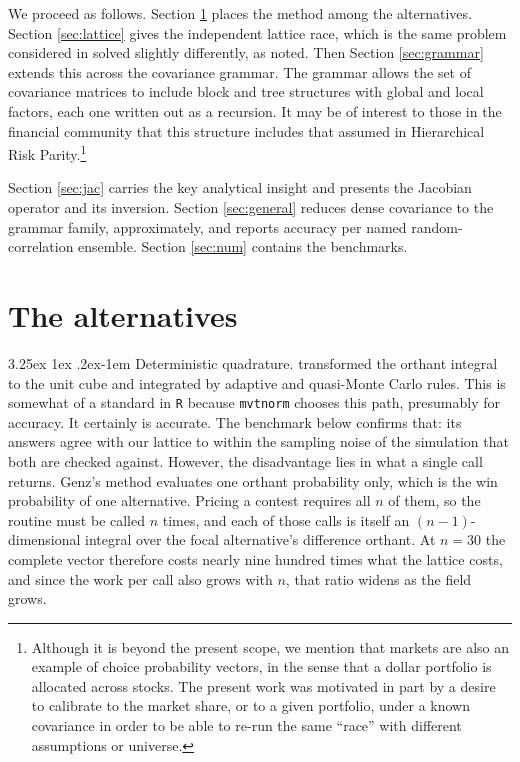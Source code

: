\documentclass[11pt]{article}
\makeatletter
\renewcommand\paragraph{\@startsection{paragraph}{4}{\z@}%
  {3.25ex \@plus1ex \@minus.2ex}{-1em}%
  {\normalfont\normalsize\itshape}}
\makeatother
\begin{document}
We proceed as follows. Section \ref{sec:alternatives} places the method among the alternatives.
Section \ref{sec:lattice} gives the independent lattice race, which is the same problem considered in \citet{cotton2021} solved slightly differently, as noted. Then Section
\ref{sec:grammar} extends this across the covariance grammar. The grammar allows the set of covariance matrices to include block and tree structures with global and local factors, each one written out as a recursion. It may be of interest to those in the financial community that this structure includes that assumed in Hierarchical Risk Parity.\footnote{Although it is beyond the present scope, we mention that markets are also an example of choice probability vectors, in the sense that a dollar portfolio is allocated across stocks. The present work was motivated in part by a desire to calibrate to the market share, or to a given portfolio, under a known covariance in order to be able to re-run the same ``race'' with different assumptions or universe.}

Section \ref{sec:jac} carries the key analytical insight and presents
the Jacobian operator and its inversion. Section \ref{sec:general} reduces
dense covariance to the grammar family, approximately, and reports accuracy
per named random-correlation ensemble. Section \ref{sec:num} contains the
benchmarks.

\section{The alternatives}\label{sec:alternatives}

\paragraph{Deterministic quadrature.} \citet{genz1992} transformed the orthant
integral to the unit cube and integrated by adaptive and quasi-Monte Carlo rules.
This is somewhat of a standard in \texttt{R} because \texttt{mvtnorm} chooses this path, presumably for accuracy. It certainly is accurate. The benchmark below confirms that: its answers agree with our lattice to within the sampling noise of the simulation that both are checked against. However, the disadvantage lies in what a single call returns. Genz's method evaluates one orthant probability only, which is the win probability of one alternative. Pricing a contest
requires all $n$ of them, so the routine must be called $n$ times, and each of
those calls is itself an $(n-1)$-dimensional integral over the focal
alternative's difference orthant. At $n=30$ the complete vector therefore
costs nearly nine hundred times what the lattice costs, and since the work per
call also grows with $n$, that ratio widens as the field grows.
\end{document}
